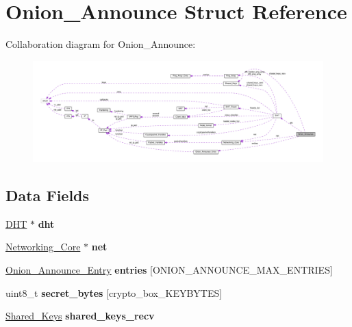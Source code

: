 \hypertarget{struct_onion___announce}{\section{Onion\+\_\+\+Announce Struct Reference}
\label{struct_onion___announce}
}


Collaboration diagram for Onion\+\_\+\+Announce\+:\nopagebreak
\begin{figure}[H]
\begin{center}
\leavevmode
\includegraphics[width=350pt]{struct_onion___announce__coll__graph}
\end{center}
\end{figure}
\subsection*{Data Fields}
\begin{DoxyCompactItemize}
\item 
\hypertarget{struct_onion___announce_a8b3d6ce8745acc52695e252bdb1531b6}{\hyperlink{struct_d_h_t}{D\+H\+T} $\ast$ {\bfseries dht}}\label{struct_onion___announce_a8b3d6ce8745acc52695e252bdb1531b6}

\item 
\hypertarget{struct_onion___announce_aa14ea2f67950f57fe4235d7375a2216c}{\hyperlink{struct_networking___core}{Networking\+\_\+\+Core} $\ast$ {\bfseries net}}\label{struct_onion___announce_aa14ea2f67950f57fe4235d7375a2216c}

\item 
\hypertarget{struct_onion___announce_a2de468d0c9db89713f12f2e7bd984023}{\hyperlink{struct_onion___announce___entry}{Onion\+\_\+\+Announce\+\_\+\+Entry} {\bfseries entries} \mbox{[}O\+N\+I\+O\+N\+\_\+\+A\+N\+N\+O\+U\+N\+C\+E\+\_\+\+M\+A\+X\+\_\+\+E\+N\+T\+R\+I\+E\+S\mbox{]}}\label{struct_onion___announce_a2de468d0c9db89713f12f2e7bd984023}

\item 
\hypertarget{struct_onion___announce_ad4bfea97df71f88d6de4cbf53f301928}{uint8\+\_\+t {\bfseries secret\+\_\+bytes} \mbox{[}crypto\+\_\+box\+\_\+\+K\+E\+Y\+B\+Y\+T\+E\+S\mbox{]}}\label{struct_onion___announce_ad4bfea97df71f88d6de4cbf53f301928}

\item 
\hypertarget{struct_onion___announce_a4c647e235c4b9d2d6d68d760c7cb1b30}{\hyperlink{struct_shared___keys}{Shared\+\_\+\+Keys} {\bfseries shared\+\_\+keys\+\_\+recv}}\label{struct_onion___announce_a4c647e235c4b9d2d6d68d760c7cb1b30}

\end{DoxyCompactItemize}


